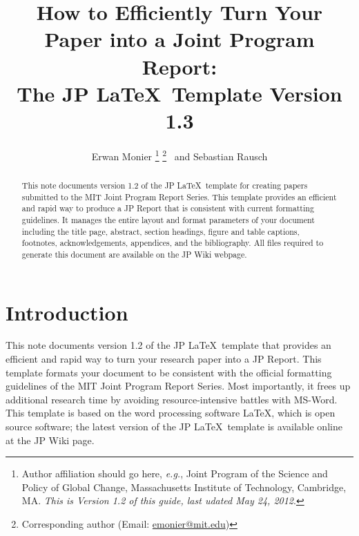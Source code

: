\documentclass[12pt,fleqn]{article}
\begin{document}

\title{How to Efficiently Turn Your Paper into a Joint Program Report:\protect\\
  The JP \LaTeX\, Template Version 1.3}

\author{Erwan Monier%
\thanks{Author affiliation should go here, \textit{e.g.}, Joint Program of the
  Science and Policy of Global Change, Massachusetts Institute of Technology,
  Cambridge, MA. \textit{This is Version 1.2 of this guide, last udated May 24,
  2012}.}
\thanks{Corresponding author (Email:
  \href{mailto:emonier@mit.edu}{emonier@mit.edu})}~
and
Sebastian Rausch
}

\maketitle %

\begin{abstract}
This note documents version 1.2 of the JP \LaTeX\, template for
creating papers submitted to the MIT Joint Program Report Series. This template
provides an efficient and rapid way to produce a JP Report that is consistent
with current formatting guidelines. It manages the entire layout and format
parameters of your document including the title page, abstract, section
headings, figure and table captions, footnotes, acknowledgements, appendices,
and the bibliography. All files required to generate this document are available
on the JP Wiki webpage.
\end{abstract}

\begin{singlespace}
\tableofcontents %
\end{singlespace}

\section{Introduction}

This note documents version 1.2 of the JP \LaTeX\, template that provides an
efficient and rapid way to turn your research paper into a JP Report. This
template formats your document to be consistent with the official formatting
guidelines of the MIT Joint Program Report Series. Most importantly, it frees up
additional research time by avoiding resource-intensive battles with MS-Word.
This template is based on the word processing software \LaTeX, which is open
source software; the latest version of the JP \LaTeX\, template is available
online at the JP Wiki page.
\end{document}
